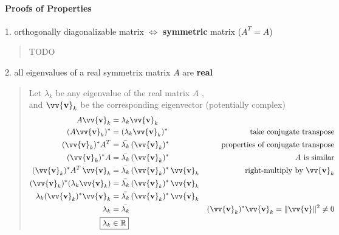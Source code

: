 \documentclass[11pt]{article}
\DeclareRobustCommand{\myvec}[1]{\vv{\mathbf{#1}}}
\newcommand{\mymat}[1]{#1}
\begin{document}
    \paragraph{Proofs of Properties}
    \noindent
    \begin{minipage}{\textwidth}
        1. orthogonally diagonalizable matrix $\iff$ \textbf{symmetric} matrix ($\mymat{A}^T = \mymat{A}$)
        \begin{quote}
            TODO
        \end{quote}
    \end{minipage} 
    \vspace{2ex}
    
    \noindent
    \begin{minipage}{\textwidth}
        2. all eigenvalues of a real symmetrix matrix $\mymat{A}$ are \textbf{real}
        \begin{quote}
            Let $\lambda_k$ be any eigenvalue of the real matrix $\mymat{A}$ , \\ 
            and $\myvec{v}_k$ be the corresponding eigenvector (potentially complex)
            \begin{align*}
                \mymat{A}\myvec{v}_k &= \lambda_k\myvec{v}_k \\
                (\mymat{A}\myvec{v}_k)^{*} &= (\lambda_k\myvec{v}_k)^{*} & \text{take conjugate transpose} \\
                (\myvec{v}_k)^{*} \mymat{A}^T &= \bar{\lambda_k}\,(\myvec{v}_k)^{*} & \text{properties of conjugate transpose} \\
                (\myvec{v}_k)^{*} \mymat{A} &= \bar{\lambda_k}\,(\myvec{v}_k)^{*} & \text{$\mymat{A}$ is similar} \\
                (\myvec{v}_k)^{*} \mymat{A}^T\,\myvec{v}_k &= \bar{\lambda_k}\,(\myvec{v}_k)^{*}\,\myvec{v}_k & \text{right-multiply by }\myvec{v}_k \\
                (\myvec{v}_k)^{*} (\lambda_k \myvec{v}_k) &= \bar{\lambda_k}\,(\myvec{v}_k)^{*}\,\myvec{v}_k & \\
                \lambda_k (\myvec{v}_k)^{*} \myvec{v}_k &= \bar{\lambda_k}\,(\myvec{v}_k)^{*}\,\myvec{v}_k & \\
                \lambda_k &= \bar{\lambda_k} & (\myvec{v}_k)^{*}\myvec{v}_k = \|\myvec{v}\|^2 \ne 0 \\
                \Aboxed{\lambda_k &\in \mathbb{R}}
            \end{align*}
        \end{quote}    
    \end{minipage} 
    \vspace{2ex}
\end{document}

